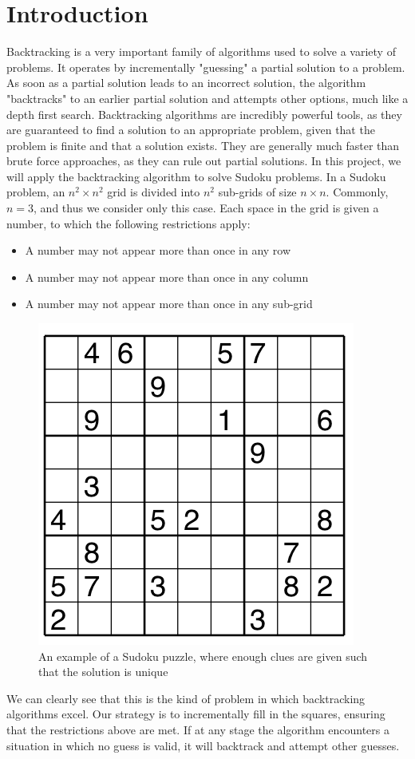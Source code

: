 \documentclass[a4paper]{article}
\begin{document}
\section{Introduction}
Backtracking is a very important family of algorithms used to solve a variety of problems. It operates by incrementally "guessing" a partial solution to a problem. As soon as a partial solution leads to an incorrect solution, the algorithm "backtracks" to an earlier partial solution and attempts other options, much like a depth first search.
\newline
Backtracking algorithms are incredibly powerful tools, as they are guaranteed to find a solution to an appropriate problem, given that the problem is finite and that a solution exists. They are generally much faster than brute force approaches, as they can rule out partial solutions.
\newline
In this project, we will apply the backtracking algorithm to solve Sudoku problems. In a Sudoku problem, an $n^2 \times n^2$ grid is divided into $n^2$ sub-grids of size $n \times n$. Commonly, $n=3$, and thus we consider only this case. Each space in the grid is given a number, to which the following restrictions apply:
\begin{itemize}
    \item A number may not appear more than once in any row
    \item A number may not appear more than once in any column
    \item A number may not appear more than once in any sub-grid
\end{itemize}
\begin{figure}[H]
    \centering
    \includegraphics[scale=0.5]{sudoku.png}
    \caption{An example of a Sudoku puzzle, where enough clues are given such that the solution is unique \cite{watanabe_2013}}
    \label{fig:sudokuGridExample}
\end{figure}
We can clearly see that this is the kind of problem in which backtracking algorithms excel. Our strategy is to incrementally fill in the squares, ensuring that the restrictions above are met. If at any stage the algorithm encounters a situation in which no guess is valid, it will backtrack and attempt other guesses.
\end{document}
